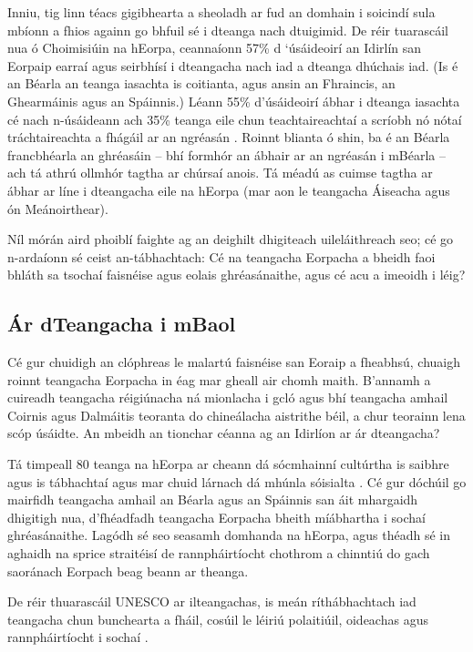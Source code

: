 \begin{multicols}{2}
Inniu, tig linn téacs gigibhearta a sheoladh ar fud an domhain i soicindí sula mbíonn a fhios againn go bhfuil sé i dteanga nach dtuigimid. De réir tuarascáil nua ó Choimisiúin na hEorpa, ceannaíonn 57\% d ‘úsáideoirí an Idirlín san Eorpaip earraí agus seirbhísí i dteangacha nach iad a dteanga dhúchais iad. (Is é an Béarla an teanga iasachta is coitianta, agus ansin an Fhraincis, an Ghearmáinis agus an Spáinnis.) Léann 55\% d'úsáideoirí ábhar i dteanga iasachta cé nach n-úsáideann ach 35\% teanga eile chun teachtaireachtaí a scríobh nó nótaí tráchtaireachta a fhágáil ar an ngréasán \cite{EC1}.  Roinnt blianta ó shin, ba é an Béarla francbhéarla an ghréasáin – bhí formhór an ábhair ar an ngréasán i mBéarla – ach tá athrú ollmhór tagtha ar chúrsaí anois. Tá méadú as cuimse tagtha ar ábhar ar líne i dteangacha eile na hEorpa (mar aon le teangacha Áiseacha agus ón Meánoirthear).

Níl mórán aird phoiblí faighte ag an deighilt dhigiteach uileláithreach seo; cé go n-ardaíonn sé ceist an-tábhachtach: Cé na teangacha Eorpacha a bheidh faoi bhláth sa tsochaí faisnéise agus eolais ghréasánaithe, agus cé acu a imeoidh i léig?

\subsection{Ár dTeangacha i mBaol}

Cé gur chuidigh an clóphreas le malartú faisnéise san Eoraip a fheabhsú, chuaigh roinnt teangacha Eorpacha in éag mar gheall air chomh maith. B’annamh a cuireadh teangacha réigiúnacha ná mionlacha i gcló agus bhí teangacha amhail Coirnis agus Dalmáitis teoranta do chineálacha aistrithe béil, a chur teorainn lena scóp úsáidte. An mbeidh an tionchar céanna ag an Idirlíon ar ár dteangacha?

Tá timpeall 80 teanga na hEorpa ar cheann dá sócmhainní cultúrtha is saibhre agus is tábhachtaí agus mar chuid lárnach dá mhúnla sóisialta \cite{EC2}.  Cé gur dóchúil go mairfidh teangacha amhail an Béarla agus an Spáinnis san áit mhargaidh dhigitigh nua, d’fhéadfadh teangacha Eorpacha bheith mí\-ábhartha i sochaí ghréasánaithe. Lagódh sé seo seasamh domhanda na hEorpa, agus théadh sé in aghaidh na sprice straitéisí de rannpháirtíocht chothrom a chinntiú do gach saoránach Eorpach beag beann ar theanga.  


De réir thuarascáil UNESCO ar ilteangachas, is meán ríthábhachtach iad teangacha chun bunchearta a fháil, cosúil le léiriú polaitiúil, oideachas agus rannpháirtíocht i sochaí \cite{Unesco1}.


\end{multicols}

